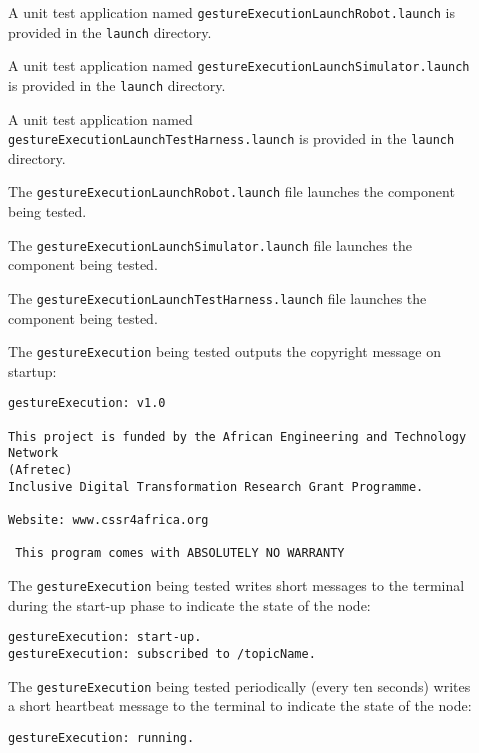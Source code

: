 \documentclass{CSSRforAfrica}
\newcommand{\checkboxChecked}{\fbox{\ding{51}}} %
\newcommand{\checkboxDashed}{\fbox{--}}         %
\begin{document}
\begin{description}
\item[\checkboxDashed] A unit test application named {\small \verb+gestureExecutionLaunchRobot.launch+} is provided in the {\small \verb+launch+} directory. 

\item[\checkboxDashed] A unit test application named {\small \verb+gestureExecutionLaunchSimulator.launch+} is provided in the {\small \verb+launch+} directory. 

\item[\checkboxDashed] A unit test application named {\small \verb+gestureExecutionLaunchTestHarness.launch+} is provided in the {\small \verb+launch+} directory. 

\item[\checkboxDashed] The {\small \verb+gestureExecutionLaunchRobot.launch+} file  launches the component being tested.

\item[\checkboxDashed] The {\small \verb+gestureExecutionLaunchSimulator.launch+} file  launches the component being tested.

\item[\checkboxDashed] The {\small \verb+gestureExecutionLaunchTestHarness.launch+} file  launches the component being tested.

\item[\checkboxChecked]  The {\small \verb+gestureExecution+} being tested outputs the copyright message on startup:
\begin{verbatim}
gestureExecution: v1.0
 
This project is funded by the African Engineering and Technology Network 
(Afretec) 
Inclusive Digital Transformation Research Grant Programme.
 
Website: www.cssr4africa.org
 
 This program comes with ABSOLUTELY NO WARRANTY
\end{verbatim}

\item[\checkboxChecked]  The {\small \verb+gestureExecution+} being tested writes short messages to the terminal during the start-up phase to
 indicate the state of the node:
\begin{verbatim}
gestureExecution: start-up.
gestureExecution: subscribed to /topicName.
\end{verbatim}

\item[\checkboxChecked]  The {\small \verb+gestureExecution+} being tested periodically (every ten seconds) writes a short heartbeat message to
 the terminal to indicate the state of the node:
\begin{verbatim}
gestureExecution: running.
\end{verbatim}


\end{description}
\end{document}
